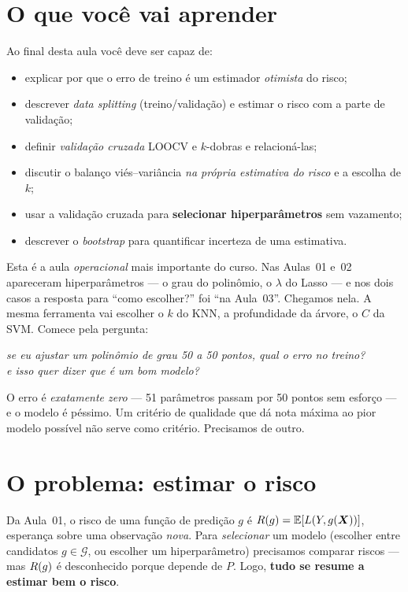 \documentclass[11pt,a4paper]{article}
\title{}
\date{}
\begin{document}

\section*{O que você vai aprender}
Ao final desta aula você deve ser capaz de:
\begin{itemize}[leftmargin=1.4cm]
  \item explicar por que o erro de treino é um estimador \emph{otimista} do risco;
  \item descrever \emph{data splitting} (treino/validação) e estimar o risco com a
        parte de validação;
  \item definir \emph{validação cruzada} LOOCV e $k$-dobras e relacioná-las;
  \item discutir o balanço viés--variância \emph{na própria estimativa do risco} e
        a escolha de $k$;
  \item usar a validação cruzada para \textbf{selecionar hiperparâmetros} sem
        vazamento;
  \item descrever o \emph{bootstrap} para quantificar incerteza de uma estimativa.
\end{itemize}

\noindent
Esta é a aula \emph{operacional} mais importante do curso. Nas Aulas~01 e~02
apareceram hiperparâmetros --- o grau do polinômio, o $\lambda$ do Lasso --- e nos
dois casos a resposta para ``como escolher?'' foi ``na Aula~03''. Chegamos nela. A
mesma ferramenta vai escolher o $k$ do KNN, a profundidade da árvore, o $C$ da SVM.
Comece pela pergunta:

\begin{center}\itshape
  se eu ajustar um polinômio de grau 50 a 50 pontos, qual o erro no treino?\\
  e isso quer dizer que é um bom modelo?
\end{center}

\noindent
O erro é \emph{exatamente zero} --- 51 parâmetros passam por 50 pontos sem esforço
--- e o modelo é péssimo. Um critério de qualidade que dá nota máxima ao pior modelo
possível não serve como critério. Precisamos de outro.

\section{O problema: estimar o risco}
Da Aula~01, o risco de uma função de predição $g$ é
$R(g)=\mathbb{E}[L(Y,g(\bm{X}))]$, esperança sobre uma observação \emph{nova}. Para
\emph{selecionar} um modelo (escolher entre candidatos $g\in\mathcal{G}$, ou
escolher um hiperparâmetro) precisamos comparar riscos --- mas $R(g)$ é
desconhecido porque depende de $P$. Logo, \textbf{tudo se resume a estimar bem o
risco}.
\end{document}
